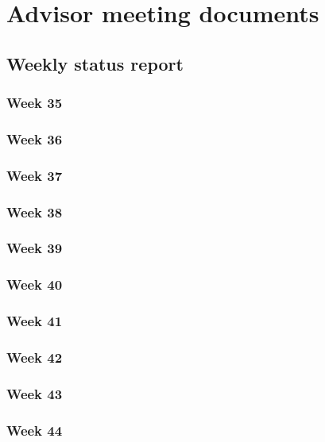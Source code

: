 \chapter{Advisor meeting documents}
\label{AppendixD}

\section{Weekly status report}

\subsection{Week 35}

\subsection{Week 36}

\subsection{Week 37}

\subsection{Week 38}

\subsection{Week 39}

\subsection{Week 40}

\subsection{Week 41}

\subsection{Week 42}

\subsection{Week 43}

\subsection{Week 44}

